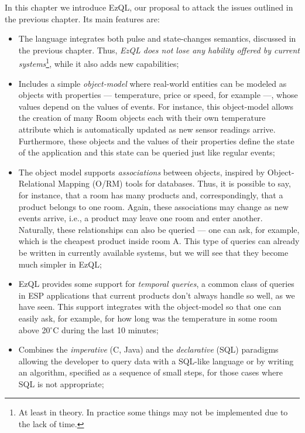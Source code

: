 \documentclass{report}
\begin{document}
In this chapter we introduce EzQL, our proposal to attack the issues
outlined in the previous chapter. Its main features are:

\begin{itemize}
\item The language integrates both pulse and state-changes semantics,
  discussed in the previous chapter. Thus, \emph{EzQL does not lose
    any hability offered by current systems}\footnote{At least in
    theory. In practice some things may not be implemented due to the
    lack of time.}, while it also adds new capabilities;
\item Includes a simple \emph{object-model} where real-world entities
  can be modeled as objects with properties --- temperature, price or
  speed, for example ---, whose values depend on the values of
  events. For instance, this object-model allows the creation of many
  Room objects each with their own temperature attribute which is
  automatically updated as new sensor readings arrive. Furthermore,
  these objects and the values of their properties define the state of
  the application and this state can be queried just like regular
  events;
\item The object model supports \emph{associations} between objects,
  inspired by Ob\-ject-Relational Mapping (O/RM) tools for
  databases. Thus, it is possible to say, for instance, that a room
  has many products and, correspondingly, that a product belongs to
  one room. Again, these associations may change as new events arrive,
  i.e., a product may leave one room and enter another. Naturally,
  these relationships can also be queried --- one can ask, for
  example, which is the cheapest product inside room A. This type of
  queries can already be written in currently available systems, but
  we will see that they become much simpler in EzQL;
\item EzQL provides some support for \emph{temporal queries}, a common
  class of queries in ESP applications that current products don't
  always handle so well, as we have seen. This support integrates with
  the object-model so that one can easily ask, for example, for how
  long was the temperature in some room above 20$^{\circ}$C during the
  last 10 minutes;
\item Combines the \emph{imperative} (C, Java) and the
  \emph{declarative} (SQL) paradigms allowing the developer to query
  data with a SQL-like language or by writing an algorithm, specified
  as a sequence of small steps, for those cases where SQL is not
  appropriate;
\end{itemize}
\end{document}

